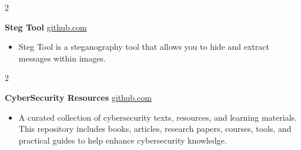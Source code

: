 \documentclass[10pt, letterpaper]{article}
\newenvironment{highlights}{
    \begin{itemize}[
        topsep=0.10 cm,
        parsep=0.10 cm,
        partopsep=0pt,
        itemsep=0pt,
        leftmargin=0 cm + 10pt
    ]
}{
    \end{itemize}
} %
\newenvironment{twocolentry}[2][]{
    \onecolentry
    \def\secondColumn{#2}
    \setcolumnwidth{\fill, 4.5 cm}
    \begin{paracol}{2}
}{
    \switchcolumn \raggedleft \secondColumn
    \end{paracol}
    \endonecolentry
} %
\begin{document}
        
            \begin{twocolentry}{
            \href{https://github.com/TimsTittus/Steg_Tool}{github.com}
        }
            \textbf{Steg Tool}\end{twocolentry}

        \vspace{0.10 cm}
        
            \begin{highlights}
                \item Steg Tool is a steganography tool that allows you to hide and extract messages within images.
            \end{highlights}

        \vspace{0.10 cm}

        
            \begin{twocolentry}{
            \href{https://github.com/TimsTittus/CyberSecurity-Texts-Resources}{github.com}
        }
            \textbf{CyberSecurity Resources}\end{twocolentry}

        \vspace{0.10 cm}
        
            \begin{highlights}
                \item A curated collection of cybersecurity texts, resources, and learning materials. This repository includes books, articles, research papers, courses, tools, and practical guides to help enhance cybersecurity knowledge.
            \end{highlights}
\end{document}
